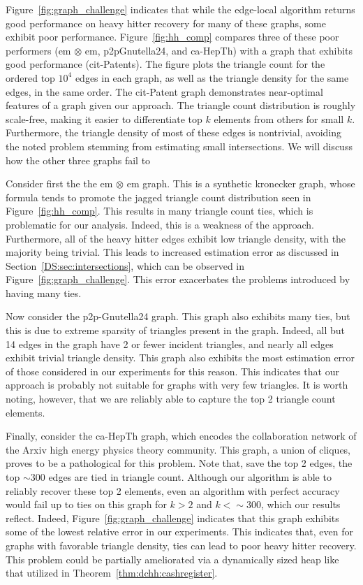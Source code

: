 \documentclass[10]{article}
\begin{document}
Figure~\ref{fig:graph_challenge} indicates that while the edge-local algorithm returns good performance on heavy hitter recovery for many of these graphs, some exhibit poor performance.
Figure~\ref{fig:hh_comp} compares three of these poor performers (em $\otimes$ em, p2pGnutella24, and ca-HepTh) with a graph that exhibits good performance (cit-Patents).
The figure plots the triangle count for the ordered top $10^4$ edges in each graph, as well as the triangle density for the same edges, in the same order.
The cit-Patent graph demonstrates near-optimal features of a graph given our approach.
The triangle count distribution is roughly scale-free, making it easier to differentiate top $k$ elements from others for small $k$. 
Furthermore, the triangle density of most of these edges is nontrivial, avoiding the noted problem stemming from estimating small intersections. 
We will discuss how the other three graphs fail to 

Consider first the the em $\otimes$ em graph. 
This is a synthetic kronecker graph, whose formula tends to promote the jagged triangle count distribution seen in Figure~\ref{fig:hh_comp}.
This results in many triangle count ties, which is problematic for our analysis. 
Indeed, this is a weakness of the approach.
Furthermore, all of the heavy hitter edges exhibit low triangle density, with the majority being trivial. 
This leads to increased estimation error as discussed in Section~\ref{DS:sec:intersections}, which can be observed in Figure~\ref{fig:graph_challenge}.
This error exacerbates the problems introduced by having many ties.

Now consider the p2p-Gnutella24 graph. 
This graph also exhibits many ties, but this is due to extreme sparsity of triangles present in the graph. 
Indeed, all but 14 edges in the graph have 2 or fewer incident triangles, and nearly all edges exhibit trivial triangle density.
This graph also exhibits the most estimation error of those considered in our experiments for this reason.
This indicates that our approach is probably not suitable for graphs with very few triangles.
It is worth noting, however, that we are reliably able to capture the top 2 triangle count elements. 

Finally, consider the ca-HepTh graph, which encodes the collaboration network of the Arxiv high energy physics theory community.
This graph, a union of cliques, proves to be a pathological for this problem. 
Note that, save the top 2 edges, the top $\sim 300$ edges are tied in triangle count.
Although our algorithm is able to reliably recover these top 2 elements, even an algorithm with perfect accuracy would fail up to ties on this graph for $k >2$ and $k < \sim 300$, which our results reflect.
Indeed, Figure~\ref{fig:graph_challenge} indicates that this graph exhibits some of the lowest relative error in our experiments.
This indicates that, even for graphs with favorable triangle density, ties can lead to poor heavy hitter recovery. 
This problem could be partially ameliorated via a dynamically sized heap like that utilized in Theorem~\ref{thm:dchh:cashregister}.
\end{document}
